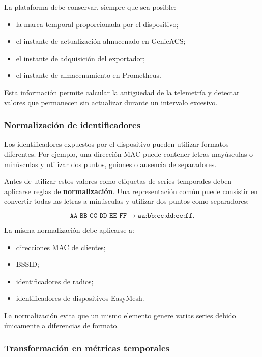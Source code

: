 La plataforma debe conservar, siempre que sea posible:

\begin{itemize}
    \item la marca temporal proporcionada por el dispositivo;
    \item el instante de actualización almacenado en GenieACS;
    \item el instante de adquisición del exportador;
    \item el instante de almacenamiento en Prometheus.
\end{itemize}

Esta información permite calcular la antigüedad de la telemetría y
detectar valores que permanecen sin actualizar durante un intervalo
excesivo.


\subsubsection*{Normalización de identificadores}

Los identificadores expuestos por el dispositivo pueden utilizar formatos
diferentes. Por ejemplo, una dirección MAC puede contener letras
mayúsculas o minúsculas y utilizar dos puntos, guiones o ausencia de
separadores.

Antes de utilizar estos valores como etiquetas de series temporales deben
aplicarse reglas de \textbf{normalización}. Una representación común
puede consistir en convertir todas las letras a minúsculas y utilizar dos
puntos como separadores:

\[
    \texttt{AA-BB-CC-DD-EE-FF}
    \longrightarrow
    \texttt{aa:bb:cc:dd:ee:ff}.
\]

La misma normalización debe aplicarse a:

\begin{itemize}
    \item direcciones MAC de clientes;
    \item BSSID;
    \item identificadores de radios;
    \item identificadores de dispositivos EasyMesh.
\end{itemize}

La normalización evita que un mismo elemento genere varias series debido
únicamente a diferencias de formato.


\subsubsection*{Transformación en métricas temporales}

